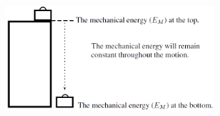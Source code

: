 	\begin{figure}[H] %
    \begin{center}
    \label{m38786*id68723!!!underscore!!!media}\label{m38786*id68723!!!underscore!!!printimage}\includegraphics[width=300px]{col11305.imgs/m38786_PG10C3_009.png} %
        
      \vspace{2pt}
    \vspace{.1in}
    
    \end{center}

 \end{figure}   

    \addtocounter{footnote}{-0}
    
